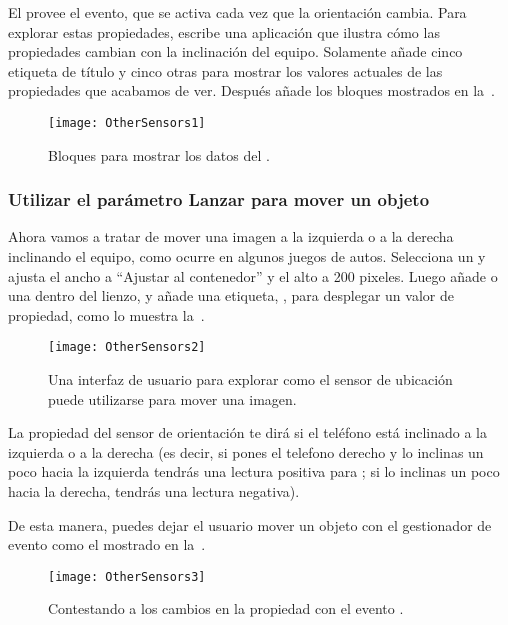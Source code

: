 El  provee el evento, que se
activa cada vez que la orientación cambia. Para explorar estas
propiedades, escribe una aplicación que ilustra cómo las propiedades
cambian con la inclinación del equipo. Solamente añade cinco etiqueta de
título y cinco otras para mostrar los valores actuales de las
propiedades que acabamos de ver. Después añade los bloques mostrados
en la~.

\begin{figure}[H]
\centering
\texttt{[image: OtherSensors1]}
\caption{Bloques para mostrar los datos del .}
\label{fig:OtherSensors1}
\end{figure}

\subsubsection*{Utilizar el parámetro Lanzar para mover un objeto}

Ahora vamos a tratar de mover una imagen a la izquierda o a la derecha
inclinando el equipo, como ocurre en algunos juegos de
autos. Selecciona un  y ajusta el ancho a ``Ajustar
al contenedor'' y el alto a 200 pixeles. Luego añade
 o una  dentro del lienzo, y
añade una etiqueta, , para desplegar un
valor de propiedad, como lo muestra la~.

\begin{figure}[H]
\centering
\texttt{[image: OtherSensors2]}
\caption{Una interfaz de usuario para explorar como el sensor de
  ubicación puede utilizarse para mover una imagen.}
\label{fig:OtherSensors2}
\end{figure}

La propiedad  del sensor de orientación te dirá si el
teléfono está inclinado a la izquierda o a la derecha (es decir, si
pones el telefono derecho y lo inclinas un poco hacia la izquierda
tendrás una lectura positiva para ; si lo inclinas un
poco hacia la derecha, tendrás una lectura negativa).

De esta manera, puedes dejar el usuario mover un objeto con el
gestionador de evento como el mostrado en la~.

\begin{figure}[H]
\centering
\texttt{[image: OtherSensors3]}
\caption{Contestando a los cambios en la propiedad 
  con el evento .}
\label{fig:OtherSensors3}
\end{figure}

